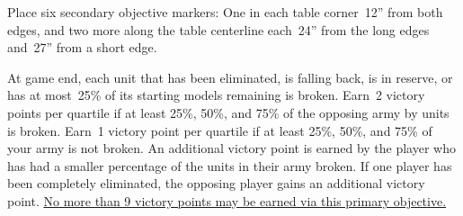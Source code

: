

\begin{tablesetup}
  \dawnofwar

  \bigskip%
  Place six secondary objective markers: One in each table corner~12''
  from both edges, and two more along the table centerline each~24''
  from the long edges and~27'' from a short edge.

\end{tablesetup}

\begin{missionrules}

\nightfalls

\end{missionrules}


\begin{scoring}
  
\begin{primaries}
  At game end, each unit that has been eliminated, is falling back, is
  in reserve, or has at most~25\% of its starting models remaining is
  broken.  Earn~2 victory points per quartile if at least 25\%, 50\%,
  and 75\% of the opposing army by units is broken.  Earn~1 victory
  point per quartile if at least 25\%, 50\%, and 75\% of your army is
  not broken.  An additional victory point is earned by the player who
  has had a smaller percentage of the units in their army broken.  If
  one player has been completely eliminated, the opposing player gains
  an additional victory point.  \underline{No more than 9 victory
    points may be earned via this primary objective.}
\end{primaries}

\begin{secondaries}
  \majoritycontrol

  \holdthefield

  \seizeground

  \assassination
\end{secondaries}

\end{scoring}
